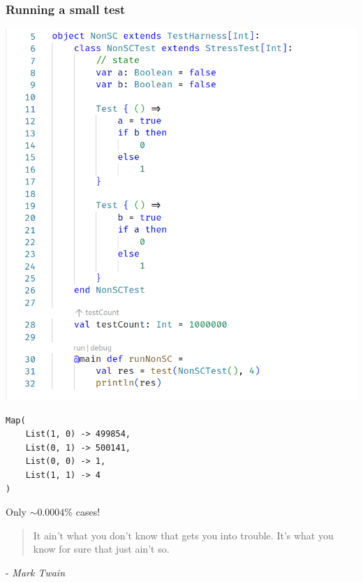 \documentclass[aspectratio=1610, xcolor={dvipsnames}]{beamer}
\begin{document}
\begin{frame}[fragile]
    \frametitle{Running a small test}

    \begin{multicols}{2}
        \includegraphics[width=\columnwidth]{fig/nonsctest.png} 

        \columnbreak

        \pause
        \vfill
        \begin{lstlisting}[numbers=none]
Map(
    List(1, 0) -> 499854, 
    List(0, 1) -> 500141, 
    List(0, 0) -> 1, 
    List(1, 1) -> 4
)
        \end{lstlisting}

        \pause

        \centering
        Only \(\sim 0.0004\%\) cases! 
    \end{multicols}

\end{frame}

\begin{frame}
    
    \begin{quote}
        It ain't what you don't know that gets you into trouble. It's what you
        know for sure that just ain't so. 
    \end{quote}

    \hfill - \emph{Mark Twain}

\end{frame}
\end{document}

